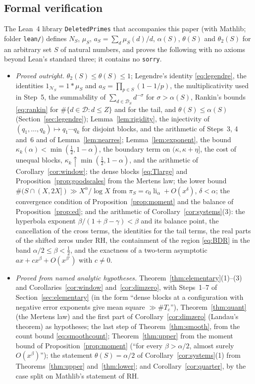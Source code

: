 \documentclass[11pt]{amsart}
\theoremstyle{remark}
\numberwithin{equation}{section}
\newcommand{\cD}{\mathcal{D}}
\newcommand{\cN}{\mathcal{N}}
\DeclareMathOperator{\li}{li}
\begin{document}
\subsection{Formal verification}
The Lean~4 library \texttt{DeletedPrimes} that accompanies this paper (with Mathlib; folder \texttt{lean/}) defines $N_S$, $\mu_S$, $a_S=\sum_d\mu_S(d)/d$, $\alpha(S)$, $\theta(S)$ and $\theta_2(S)$ for an arbitrary set $S$ of natural numbers, and proves the following with no axioms beyond Lean's standard three; it contains no \texttt{sorry}.
\begin{itemize}
\item \emph{Proved outright.} $\theta_2(S)\le\theta(S)\le1$; Legendre's identity \eqref{eq:legendre}, the identities $1_{\cN_S}=1*\mu_S$ and $a_S=\prod_{p\in S}(1-1/p)$, the multiplicativity used in Step~5, the summability of $\sum_{d\in\cD_S}d^{-\sigma}$ for $\sigma>\alpha(S)$, Rankin's bounds \eqref{eq:rankin} for $\#\{d\in\cD:d\le Z\}$ and for the tail, and $\theta(S)\le\alpha(S)$ (Section~\ref{sec:legendre}); Lemma~\ref{lem:rigidity}, the injectivity of $(q_1,\dots,q_k)\mapsto q_1\cdots q_k$ for disjoint blocks, and the arithmetic of Steps~3, 4 and~6 and of Lemma~\ref{lem:nearres}; Lemma~\ref{lem:exponent}, the bound $\kappa_k(\alpha)<\min(\tfrac12,1-\alpha)$, the boundary term on $(\kappa,\kappa+\eta]$, the cost of unequal blocks, $\kappa_k\uparrow\min(\tfrac12,1-\alpha)$, and the arithmetic of Corollary~\ref{cor:window}; the dense blocks \eqref{eq:Tlarge} and Proposition~\ref{prop:goodscales} from the Mertens law; the lower bound $\#(S\cap(X,2X])\gg X^{\alpha}/\log X$ from $\pi_S=c_0\li_\alpha+O(x^{\delta})$, $\delta<\alpha$; the convergence condition of Proposition~\ref{prop:moment} and the balance of Proposition~\ref{prop:ed}; and the arithmetic of Corollary~\ref{cor:systems}(3): the hyperbola exponent $\beta/(1+\beta-\gamma)<\beta$ and its balance point, the cancellation of the cross terms, the identities for the tail terms, the real parts of the shifted zeros under RH, the containment of the region \eqref{eq:BDR} in the band $\alpha/2\le\beta<\tfrac12$, and the exactness of a two-term asymptotic $ax+cx^{\beta}+O(x^{\beta'})$ with $c\ne0$.
\item \emph{Proved from named analytic hypotheses.} Theorem~\ref{thm:elementary}(1)--(3) and Corollaries~\ref{cor:window} and~\ref{cor:dimzero}, with Steps~1--7 of Section~\ref{sec:elementary} (in the form ``dense blocks at a configuration with negative error exponents give mean square $\gg\#T_c$''), Theorem~\ref{thm:quant} (the Mertens law) and the first part of Corollary~\ref{cor:dimzero} (Landau's theorem) as hypotheses; the last step of Theorem~\ref{thm:smooth}, from the count bound \eqref{eq:smoothcount}; Theorem~\ref{thm:upper} from the moment bound of Proposition~\ref{prop:moment} (``for every $\beta>\alpha/2$, almost surely $O(x^{\beta})$''); the statement $\theta(S)=\alpha/2$ of Corollary~\ref{cor:systems}(1) from Theorems~\ref{thm:upper} and~\ref{thm:lower}; and Corollary~\ref{cor:quarter}, by the case split on Mathlib's statement of RH.
\end{itemize}
\end{document}
